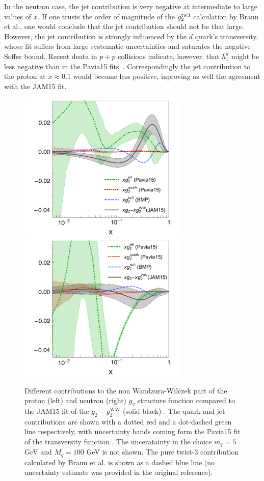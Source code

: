 \documentclass[preprintnumbers,floatfix,nofootinbib]{revtex4}
\begin{document}
In the neutron case, the jet contribution is very negative at intermediate to
large values of $x$. 
If one trusts the order of magnitude of the $g_2^{\rm tw3}$
calculation by Braun et al., one would conclude that the jet contribution
should not be that large. However, the jet contribution is strongly influenced
by the $d$ quark's
transversity, whose fit suffers from large systematic uncertainties and
saturates the negative Soffer bound. Recent deata in $p+p$ collisions indicate,
however, that $h_1^d$ might be less negative than in the Pavia15
fits~\cite{Radici:2016lam}.
Correspondingly the jet contribution to the proton at $x \approx 0.1$
would become less positive, inproving as well the agreement with the JAM15
fit. 

\begin{figure}[tbh]
\begin{center}
\includegraphics[width=8cm]{g2contrib}
\includegraphics[width=8cm]{g2contribN}
\caption{\label{f:g2contrib} 
Different contributions to the non Wandzura-Wilczek part of the proton (left)
and neutron (right) $g_2$ structure function compared to the JAM15 fit of the
$g_2-g_2^{\text{WW}}$ (solid black) \cite{Sato:2016tuz}. The quark and jet
contributions are shown with a dotted red and a dot-dashed green line
respectively, with uncertainty bands coming form the Pavia15 fit of the
transversity function \cite{Radici:2015mwa}. The unceratainty in the choice
$m_q=5$ GeV and $M_q=100$ GeV is not shown. The pure twist-3 contribution
calculated by Braun et al. \cite{Braun:2011aw} is shown as a dashed blue line
(no uncertainty estimate was provided in the original reference). 
}
\end{center}
\end{figure}
\end{document}
